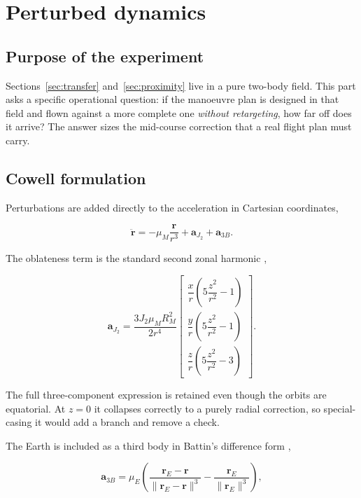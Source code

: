 \section{Perturbed dynamics}
\label{sec:perturbations}

\subsection{Purpose of the experiment}

Sections~\ref{sec:transfer} and~\ref{sec:proximity} live in a pure two-body
field. This part asks a specific operational question: if the manoeuvre plan is
designed in that field and flown against a more complete one \emph{without
retargeting}, how far off does it arrive? The answer sizes the mid-course
correction that a real flight plan must carry.

\subsection{Cowell formulation}

Perturbations are added directly to the acceleration in Cartesian coordinates,

\begin{equation}
\ddot{\mathbf r} = -\mu_M\frac{\mathbf r}{r^3}
                 + \mathbf a_{J_2}
                 + \mathbf a_{3B}.
\label{eq:cowell}
\end{equation}

The oblateness term is the standard second zonal harmonic \cite{vallado},

\begin{equation}
\mathbf a_{J_2} = \frac{3 J_2 \mu_M R_M^2}{2 r^4}
\begin{bmatrix}
\dfrac{x}{r}\left(5\dfrac{z^2}{r^2}-1\right)\\[8pt]
\dfrac{y}{r}\left(5\dfrac{z^2}{r^2}-1\right)\\[8pt]
\dfrac{z}{r}\left(5\dfrac{z^2}{r^2}-3\right)
\end{bmatrix}.
\label{eq:j2}
\end{equation}

The full three-component expression is retained even though the orbits are
equatorial. At $z = 0$ it collapses correctly to a purely radial correction, so
special-casing it would add a branch and remove a check.

The Earth is included as a third body in Battin's difference form \cite{battin},

\begin{equation}
\mathbf a_{3B} = \mu_E\left(\frac{\mathbf r_E - \mathbf r}{\lVert \mathbf r_E - \mathbf r\rVert^3}
                          - \frac{\mathbf r_E}{\lVert \mathbf r_E \rVert^3}\right),
\label{eq:thirdbody}
\end{equation}


